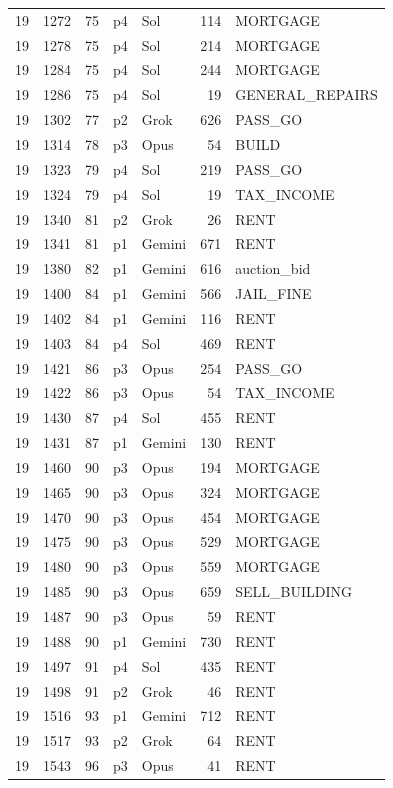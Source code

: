 \begin{longtable}{r r r l l r >{\ttfamily}l}
19 & 1272 & 75 & p4 & Sol & 114 & MORTGAGE \\
19 & 1278 & 75 & p4 & Sol & 214 & MORTGAGE \\
19 & 1284 & 75 & p4 & Sol & 244 & MORTGAGE \\
19 & 1286 & 75 & p4 & Sol & 19 & GENERAL\_REPAIRS \\
19 & 1302 & 77 & p2 & Grok & 626 & PASS\_GO \\
19 & 1314 & 78 & p3 & Opus & 54 & BUILD \\
19 & 1323 & 79 & p4 & Sol & 219 & PASS\_GO \\
19 & 1324 & 79 & p4 & Sol & 19 & TAX\_INCOME \\
19 & 1340 & 81 & p2 & Grok & 26 & RENT \\
19 & 1341 & 81 & p1 & Gemini & 671 & RENT \\
19 & 1380 & 82 & p1 & Gemini & 616 & auction\_bid \\
19 & 1400 & 84 & p1 & Gemini & 566 & JAIL\_FINE \\
19 & 1402 & 84 & p1 & Gemini & 116 & RENT \\
19 & 1403 & 84 & p4 & Sol & 469 & RENT \\
19 & 1421 & 86 & p3 & Opus & 254 & PASS\_GO \\
19 & 1422 & 86 & p3 & Opus & 54 & TAX\_INCOME \\
19 & 1430 & 87 & p4 & Sol & 455 & RENT \\
19 & 1431 & 87 & p1 & Gemini & 130 & RENT \\
19 & 1460 & 90 & p3 & Opus & 194 & MORTGAGE \\
19 & 1465 & 90 & p3 & Opus & 324 & MORTGAGE \\
19 & 1470 & 90 & p3 & Opus & 454 & MORTGAGE \\
19 & 1475 & 90 & p3 & Opus & 529 & MORTGAGE \\
19 & 1480 & 90 & p3 & Opus & 559 & MORTGAGE \\
19 & 1485 & 90 & p3 & Opus & 659 & SELL\_BUILDING \\
19 & 1487 & 90 & p3 & Opus & 59 & RENT \\
19 & 1488 & 90 & p1 & Gemini & 730 & RENT \\
19 & 1497 & 91 & p4 & Sol & 435 & RENT \\
19 & 1498 & 91 & p2 & Grok & 46 & RENT \\
19 & 1516 & 93 & p1 & Gemini & 712 & RENT \\
19 & 1517 & 93 & p2 & Grok & 64 & RENT \\
19 & 1543 & 96 & p3 & Opus & 41 & RENT \\

\end{longtable}
